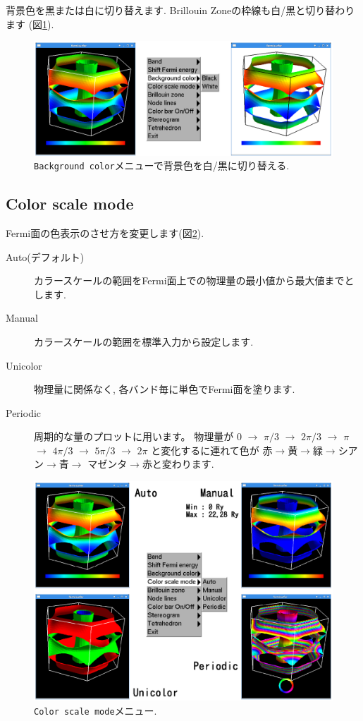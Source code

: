 \documentclass[12pt]{jarticle}
\begin{document}
背景色を黒または白に切り替えます. 
Brillouin Zoneの枠線も白/黒と切り替わります (図\ref{fig_background}). 

\begin{figure}[!ht]
  \includegraphics[width=17cm]{figs/background.eps}
  \caption{\texttt{Background color}メニューで背景色を白/黒に切り替える.}
  \label{fig_background}
\end{figure}

\subsection{Color scale mode}

Fermi面の色表示のさせ方を変更します(図\ref{fig_colorscale}). 
\begin{description}
\item[Auto(デフォルト)] 
  カラースケールの範囲をFermi面上での物理量の最小値から最大値までとします.
\item[Manual] カラースケールの範囲を標準入力から設定します.
\item[Unicolor] 物理量に関係なく, 各バンド毎に単色でFermi面を塗ります.
\item[Periodic] 周期的な量のプロットに用います。
  物理量が
  0 $\rightarrow$ $\pi/3$ $\rightarrow$ $2\pi/3$ $\rightarrow$ $\pi$ $\rightarrow$ 
  $4\pi/3$ $\rightarrow$ $5\pi/3$ $\rightarrow$ $2\pi$
  と変化するに連れて色が
  赤$\rightarrow$黄$\rightarrow$緑$\rightarrow$シアン$\rightarrow$青$\rightarrow$
  マゼンタ$\rightarrow$赤と変わります. 
\end{description}

\begin{figure}[!ht]
  \includegraphics[width=17cm]{figs/colorscale.eps}
  \caption{\texttt{Color scale mode}メニュー.}
  \label{fig_colorscale}
\end{figure}
\end{document}
